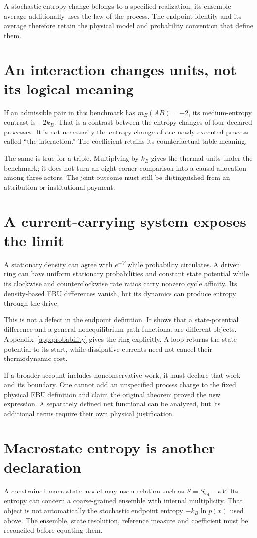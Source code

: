 A stochastic entropy change belongs to a specified realization; its ensemble average additionally uses the law of the process. The endpoint identity and its average therefore retain the physical model and probability convention that define them.

\section{An interaction changes units, not its logical meaning}
If an admissible pair in this benchmark has $m_E(AB)=-2$, its medium-entropy contrast is $-2k_B$. That is a contrast between the entropy changes of four declared processes. It is not necessarily the entropy change of one newly executed process called ``the interaction.'' The coefficient retains its counterfactual table meaning.

The same is true for a triple. Multiplying by $k_B$ gives the thermal units under the benchmark; it does not turn an eight-corner comparison into a causal allocation among three actors. The joint outcome must still be distinguished from an attribution or institutional payment.

\section{A current-carrying system exposes the limit}
A stationary density can agree with $e^{-V}$ while probability circulates. A driven ring can have uniform stationary probabilities and constant state potential while its clockwise and counterclockwise rate ratios carry nonzero cycle affinity. Its density-based EBU differences vanish, but its dynamics can produce entropy through the drive.

This is not a defect in the endpoint definition. It shows that a state-potential difference and a general nonequilibrium path functional are different objects. Appendix~\ref{app:probability} gives the ring explicitly. A loop returns the state potential to its start, while dissipative currents need not cancel their thermodynamic cost.

If a broader account includes nonconservative work, it must declare that work and its boundary. One cannot add an unspecified process charge to the fixed physical EBU definition and claim the original theorem proved the new expression. A separately defined net functional can be analyzed, but its additional terms require their own physical justification.

\section{Macrostate entropy is another declaration}
A constrained macrostate model may use a relation such as $S=S_{\mathrm{eq}}-\kappa V$. Its entropy can concern a coarse-grained ensemble with internal multiplicity. That object is not automatically the stochastic endpoint entropy $-k_B\ln p(x)$ used above. The ensemble, state resolution, reference measure and coefficient must be reconciled before equating them.

